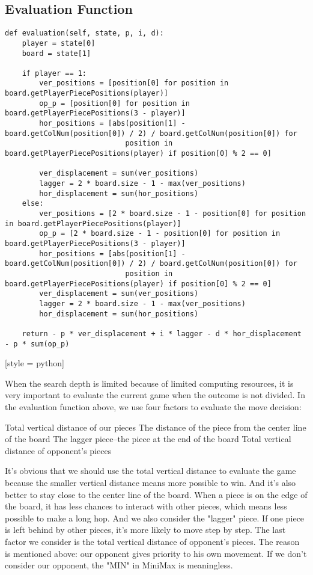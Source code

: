 \documentclass[aps,letterpaper,10pt]{revtex4}
\begin{document}
\subsection{Evaluation Function}
\begin{lstlisting}[style = python]
def evaluation(self, state, p, i, d):
	player = state[0]
	board = state[1]

	if player == 1:
		ver_positions = [position[0] for position in board.getPlayerPiecePositions(player)]
		op_p = [position[0] for position in board.getPlayerPiecePositions(3 - player)]
		hor_positions = [abs(position[1] - board.getColNum(position[0]) / 2) / board.getColNum(position[0]) for
							position in board.getPlayerPiecePositions(player) if position[0] % 2 == 0]

		ver_displacement = sum(ver_positions)
		lagger = 2 * board.size - 1 - max(ver_positions)
		hor_displacement = sum(hor_positions)
	else:
		ver_positions = [2 * board.size - 1 - position[0] for position in board.getPlayerPiecePositions(player)]
		op_p = [2 * board.size - 1 - position[0] for position in board.getPlayerPiecePositions(3 - player)]
		hor_positions = [abs(position[1] - board.getColNum(position[0]) / 2) / board.getColNum(position[0]) for
							position in board.getPlayerPiecePositions(player) if position[0] % 2 == 0]
		ver_displacement = sum(ver_positions)
		lagger = 2 * board.size - 1 - max(ver_positions)
		hor_displacement = sum(hor_positions)

	return - p * ver_displacement + i * lagger - d * hor_displacement - p * sum(op_p)
\end{lstlisting}[style = python]

When the search depth is limited because of limited computing resources, it is very important to evaluate the current game when the outcome is not divided.
In the evaluation function above, we use four factors to evaluate the move decision:
\begin{itemize}
	Total vertical distance of our pieces
	The distance of the piece from the center line of the board
	The lagger piece--the piece at the end of the board
	Total vertical distance of opponent's pieces
\end{itemize}

It's obvious that we should use the total vertical distance to evaluate the game because the smaller vertical distance means more possible to win.
And it's also better to stay close to the center line of the board. 
When a piece is on the edge of the board, it has less chances to interact with other pieces,
which means less possible to make a long hop.
And we also consider the "lagger" piece. If one piece is left behind by other pieces, it's more likely to move step by step.
The last factor we consider is the total vertical distance of opponent's pieces. 
The reason is mentioned above: our opponent gives priority to his own movement. 
If we don't consider our opponent, the "MIN" in MiniMax is meaningless.
\end{document}

